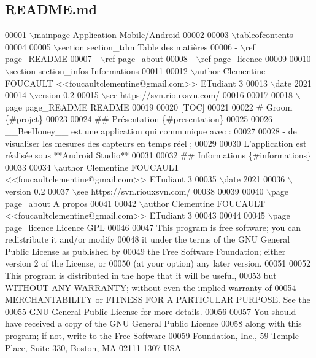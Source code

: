 \hypertarget{_r_e_a_d_m_e_8md_source}{}\subsection{R\+E\+A\+D\+M\+E.\+md}

\begin{DoxyCode}
00001 \(\backslash\)mainpage Application Mobile/Android
00002 
00003 \(\backslash\)tableofcontents
00004 
00005 \(\backslash\)section section\_tdm Table des matières
00006 - \(\backslash\)ref page\_README
00007 - \(\backslash\)ref page\_about
00008 - \(\backslash\)ref page\_licence
00009 
00010 \(\backslash\)section section\_infos Informations
00011 
00012 \(\backslash\)author Clementine FOUCAULT <<foucaultclementine@gmail.com>> ETudiant 3
00013 \(\backslash\)date 2021
00014 \(\backslash\)version 0.2
00015 \(\backslash\)see https://svn.riouxsvn.com/
00016 
00017 
00018 \(\backslash\)page page\_README README
00019 
00020 [TOC]
00021 
00022 # Groom \{#projet\}
00023 
00024 ## Présentation \{#presentation\}
00025 
00026 \_\_BeeHoney\_\_ est une application qui communique avec :
00027 
00028 - de visualiser les mesures des capteurs en temps réel ;
00029 
00030 L’application est réalisée sous **Android Studio**
00031 
00032 ## Informations \{#informations\}
00033 
00034 \(\backslash\)author Clementine FOUCAULT <<foucaultclementine@gmail.com>> ETudiant 3
00035 \(\backslash\)date 2021
00036 \(\backslash\)version 0.2
00037 \(\backslash\)see https://svn.riouxsvn.com/
00038 
00039 
00040 \(\backslash\)page page\_about A propos
00041 
00042 \(\backslash\)author Clementine FOUCAULT <<foucaultclementine@gmail.com>> ETudiant 3
00043 
00044 
00045 \(\backslash\)page page\_licence Licence GPL
00046 
00047 This program is free software; you can redistribute it and/or modify
00048 it under the terms of the GNU General Public License as published by
00049 the Free Software Foundation; either version 2 of the License, or
00050 (at your option) any later version.
00051 
00052 This program is distributed in the hope that it will be useful,
00053 but WITHOUT ANY WARRANTY; without even the implied warranty of
00054 MERCHANTABILITY or FITNESS FOR A PARTICULAR PURPOSE. See the
00055 GNU General Public License for more details.
00056 
00057 You should have received a copy of the GNU General Public License
00058 along with this program; if not, write to the Free Software
00059 Foundation, Inc., 59 Temple Place, Suite 330, Boston, MA 02111-1307 USA
\end{DoxyCode}
